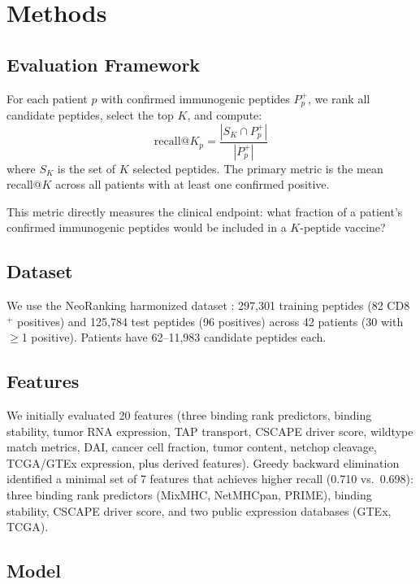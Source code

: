 \documentclass[11pt,twocolumn]{article}
\begin{document}
\section{Methods}

\subsection{Evaluation Framework}

For each patient $p$ with confirmed immunogenic peptides $P_p^{+}$, we rank all candidate peptides, select the top $K$, and compute:
\begin{equation}
\text{recall@}K_p = \frac{|S_K \cap P_p^{+}|}{|P_p^{+}|}
\end{equation}
where $S_K$ is the set of $K$ selected peptides. The primary metric is the mean recall@$K$ across all patients with at least one confirmed positive.

This metric directly measures the clinical endpoint: what fraction of a patient's confirmed immunogenic peptides would be included in a $K$-peptide vaccine?

\subsection{Dataset}

We use the NeoRanking harmonized dataset \cite{muller2023neoranking}: 297,301 training peptides (82 CD8$^{+}$ positives) and 125,784 test peptides (96 positives) across 42 patients (30 with $\geq$1 positive). Patients have 62--11,983 candidate peptides each.

\subsection{Features}

We initially evaluated 20 features (three binding rank predictors, binding stability, tumor RNA expression, TAP transport, CSCAPE driver score, wildtype match metrics, DAI, cancer cell fraction, tumor content, netchop cleavage, TCGA/GTEx expression, plus derived features). Greedy backward elimination identified a minimal set of 7 features that achieves higher recall (0.710 vs.\ 0.698): three binding rank predictors (MixMHC, NetMHCpan, PRIME), binding stability, CSCAPE driver score, and two public expression databases (GTEx, TCGA).

\subsection{Model}
\end{document}
